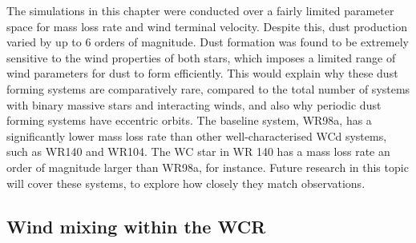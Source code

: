 \documentclass[fleqn,usenatbib]{mnras}
\begin{document}
The simulations in this chapter were conducted over a fairly limited parameter space for mass loss rate and wind terminal velocity.
Despite this, dust production varied by up to 6 orders of magnitude.
Dust formation was found to be extremely sensitive to the wind properties of both stars, which imposes a limited range of wind parameters for dust to form efficiently.
This would explain why these dust forming systems are comparatively rare, compared to the total number of systems with binary massive stars and interacting winds, and also why periodic dust forming systems have eccentric orbits.
The baseline system, WR98a, has a significantly lower mass loss rate than other well-characterised WCd systems, such as WR140 and WR104.
The WC star in WR 140 has a mass loss rate an order of magnitude larger than WR98a, for instance.
Future research in this topic will cover these systems,
to explore how closely they match observations.

\subsection{Wind mixing within the WCR}
\end{document}
